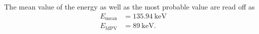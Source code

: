 The mean value of the energy as well as the most probable value are read off as
\begin{align*}
    E_{\mathrm{mean}} &= \qty{135.94}{\kilo\electronvolt} \\
    E_{\mathrm{MPV}}  &= \qty{89}{\kilo\electronvolt}. \\
\end{align*}

